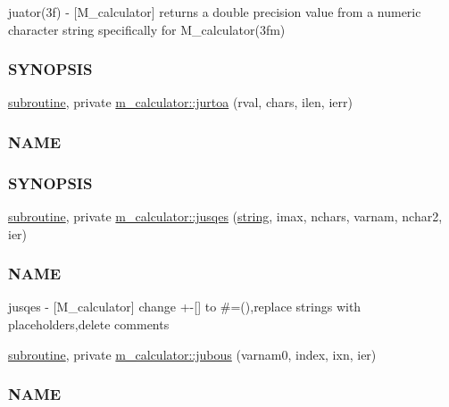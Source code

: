 \begin{DoxyCompactItemize}
\begin{DoxyCompactList}
juator(3f) -\/ \mbox{[}M\+\_\+calculator\mbox{]} returns a double precision value from a numeric character string specifically for M\+\_\+calculator(3fm) \subsubsection*{S\+Y\+N\+O\+P\+S\+IS}\end{DoxyCompactList}\item 
\hyperlink{M__stopwatch_83_8txt_acfbcff50169d691ff02d4a123ed70482}{subroutine}, private \hyperlink{namespacem__calculator_a5031622e3d493b738ac425f1fa454a60}{m\+\_\+calculator\+::jurtoa} (rval, chars, ilen, ierr)
\begin{DoxyCompactList}\small\item\em \subsubsection*{N\+A\+ME}

\subsubsection*{S\+Y\+N\+O\+P\+S\+IS}\end{DoxyCompactList}\item 
\hyperlink{M__stopwatch_83_8txt_acfbcff50169d691ff02d4a123ed70482}{subroutine}, private \hyperlink{namespacem__calculator_a1c053df0b605f7d96a5982c44a9a1d11}{m\+\_\+calculator\+::jusqes} (\hyperlink{what__overview_81_8txt_a74cb7e955273b9f9157b4f0c18a38849}{string}, imax, nchars, varnam, nchar2, ier)
\begin{DoxyCompactList}\small\item\em \subsubsection*{N\+A\+ME}

jusqes -\/ \mbox{[}M\+\_\+calculator\mbox{]} change +-\/\mbox{[}\mbox{]} to \#=(),replace strings with placeholders,delete comments \end{DoxyCompactList}\item 
\hyperlink{M__stopwatch_83_8txt_acfbcff50169d691ff02d4a123ed70482}{subroutine}, private \hyperlink{namespacem__calculator_a82912c44b358ca053754669f542d80af}{m\+\_\+calculator\+::jubous} (varnam0, index, ixn, ier)
\begin{DoxyCompactList}\small\item\em \subsubsection*{N\+A\+ME}


\end{DoxyCompactList}
\end{DoxyCompactItemize}
